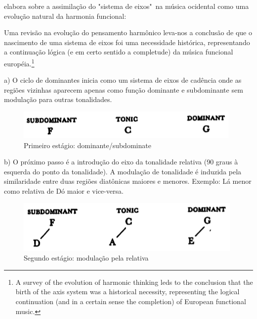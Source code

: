 \documentclass[
	12pt,				%
	openright,			%
	twoside,			%
	a4paper,			%
	english,			%
	french,				%
	spanish,			%
	brazil				%
	]{abntex2}
\begin{document}
 elabora sobre a assimilação do "sistema de eixos"\ na música ocidental como uma evolução natural da harmonia funcional:  

\begin{citacao}
Uma revisão na evolução do pensamento harmônico leva-nos a conclusão de que o nascimento de uma sistema de eixos foi uma necessidade histórica, representando a continuação lógica (e em certo sentido a completude) da música funcional européia.\cite[ p.08]{lendvai1971bela}\footnote{A survey of the evolution of harmonic thinking leds to the conclusion that the birth of the axis system was a historical necessity, representing the logical continuation (and in a certain sense the completion) of European functional music.\cite[ p.08]{lendvai1971bela}}
\end{citacao}


a) O ciclo de dominantes inicia como um sistema de eixos de cadência onde as regiões vizinhas aparecem apenas como função dominante e subdominante sem modulação para outras tonalidades. 

\begin{figure}[!h]
	\caption{\label{fig_grafico}Primeiro estágio: dominante/subdominate}
	\begin{center}
	    \includegraphics[scale=0.5]{axis/estagio01.png}
	\end{center}
\end{figure}


b) O próximo passo é a introdução do eixo da tonalidade relativa (90 graus à esquerda do ponto da tonalidade). A modulação de tonalidade é induzida pela similaridade entre duas regiões diatônicas maiores e menores. Exemplo: Lá menor como relativa de Dó maior e vice-versa.

\begin{figure}[!h]
	\caption{\label{fig_grafico}Segundo estágio: modulação pela relativa}
	\begin{center}
	    \includegraphics[scale=0.5]{axis/estagio02.png}
	\end{center}
\end{figure}
\end{document}
